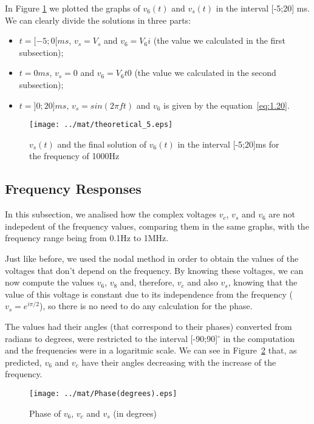 In Figure \ref{fig:mat4} we plotted the graphs of $v_6(t)$ and $v_s(t)$ in the interval [-5;20] ms. We can clearly divide the solutions in three parts:
\begin{itemize}
\item $t=[-5;0[ ms$, $v_s = V_s$ and $v_6 = V_6i$ (the value we calculated in the first subsection);
\item $t=0 ms$, $v_s = 0$ and $v_6 = V_6t0$ (the value we calculated in the second subsection);
\item $t=]0;20] ms$, $v_s = sin(2\pi f t)$ and $v_6$ is given by the equation~\ref{eq:1.20}.
\end{itemize}

\begin{figure}[H] \centering
\texttt{[image: ../mat/theoretical\_5.eps]}
\caption{$v_s(t)$ and the final solution of $v_6(t)$ in the interval [-5;20]ms for the frequency of 1000Hz}
\label{fig:mat4}
\end{figure}


\subsection{Frequency Responses}
In this subsection, we analised how the complex voltages $v_c$, $v_s$ and $v_6$ are not indepedent of the frequency values, comparing them in the same graphs, with the frequency range being from 0.1Hz to 1MHz. 

Just like before, we used the nodal method in order to obtain the values of the voltages that don't depend on the frequency. By knowing these voltages, we can now compute the values $v_6$, $v_8$ and, therefore, $v_c$ and also $v_s$, knowing that the value of this voltage is constant due to its independence from the frequency ($v_s = e^{i\pi/2}$), so there is no need to do any calculation for the phase.

The values had their angles (that correspond to their phases) converted from radians to degrees, were restricted to the interval [-90;90]$^{\circ}$ in the computation and the frequencies were in a logaritmic scale. We can see in Figure~\ref{fig:mat5db} that, as predicted, $v_6$ and $v_c$ have their angles decreasing with the increase of the frequency.

\begin{figure}[H] \centering
\texttt{[image: ../mat/Phase(degrees).eps]}
\caption{Phase of $v_6$, $v_c$ and $v_s$ (in degrees)}
\label{fig:mat5db}
\end{figure}

